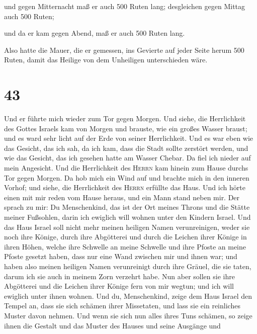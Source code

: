  und gegen Mitternacht maß er auch 500 Ruten lang;
 desgleichen gegen Mittag auch 500 Ruten;

 und da er kam gegen Abend, maß er auch 500 Ruten lang.

 Also hatte die Mauer, die er gemessen, ins Gevierte auf
jeder Seite herum 500 Ruten, damit das Heilige von dem Unheiligen
unterschieden wäre.

\hypertarget{section-42}{%
\section{43}\label{section-42}}

 Und er führte mich wieder zum Tor gegen Morgen.
 Und siehe, die Herrlichkeit des Gottes Israels kam von
Morgen und brauste, wie ein großes Wasser braust; und es ward sehr licht
auf der Erde von seiner Herrlichkeit.  Und es war eben wie
das Gesicht, das ich sah, da ich kam, dass die Stadt sollte zerstört
werden, und wie das Gesicht, das ich gesehen hatte am Wasser Chebar. Da
fiel ich nieder auf mein Angesicht.  Und die Herrlichkeit
des \textsc{Herrn} kam hinein zum Hause durchs Tor gegen Morgen.
 Da hob mich ein Wind auf und brachte mich in den inneren
Vorhof; und siehe, die Herrlichkeit des \textsc{Herrn} erfüllte das
Haus.  Und ich hörte einen mit mir reden vom Hause heraus,
und ein Mann stand neben mir.  Der sprach zu mir: Du
Menschenkind, das ist der Ort meines Throns und die Stätte meiner
Fußsohlen, darin ich ewiglich will wohnen unter den Kindern Israel. Und
das Haus Israel soll nicht mehr meinen heiligen Namen verunreinigen,
weder sie noch ihre Könige, durch ihre Abgötterei und durch die Leichen
ihrer Könige in ihren Höhen,  welche ihre Schwelle an
meine Schwelle und ihre Pfoste an meine Pfoste gesetzt haben, dass nur
eine Wand zwischen mir und ihnen war; und haben also meinen heiligen
Namen verunreinigt durch ihre Gräuel, die sie taten, darum ich sie auch
in meinem Zorn verzehrt habe.  Nun aber sollen sie ihre
Abgötterei und die Leichen ihrer Könige fern von mir wegtun; und ich
will ewiglich unter ihnen wohnen.  Und du, Menschenkind,
zeige dem Haus Israel den Tempel an, dass sie sich schämen ihrer
Missetaten, und lass sie ein reinliches Muster davon nehmen.
 Und wenn sie sich nun alles ihres Tuns schämen, so zeige
ihnen die Gestalt und das Muster des Hauses und seine Ausgänge und
